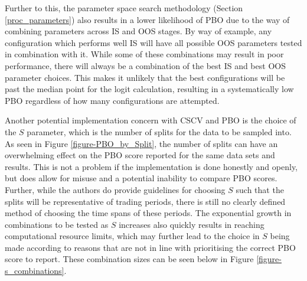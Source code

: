 \documentclass[a4paper,11pt,oneside]{article}
\theoremstyle{plain}
\theoremstyle{definition}
\begin{document}
	Further to this, the parameter space search methodology (Section \ref{proc_parameters}) also results in a lower likelihood of PBO due to the way of combining parameters across IS and OOS stages. By way of example, any configuration which performs well IS will have all possible OOS parameters tested in combination with it. While some of these combinations may result in poor performance, there will always be a combination of the best IS and best OOS parameter choices. This makes it unlikely that the best configurations will be past the median point for the logit calculation, resulting in a systematically low PBO regardless of how many configurations are attempted.\newline
	
	Another potential implementation concern with CSCV and PBO is the choice of the $S$ parameter, which is the number of splits for the data to be sampled into. As seen in Figure \ref{figure-PBO_by_Split}, the number of splits can have an overwhelming effect on the PBO score reported for the same data sets and results. This is not a problem if the implementation is done honestly and openly, but does allow for misuse and a potential inability to compare PBO scores. Further, while the authors do provide guidelines for choosing $S$ such that the splits will be representative of trading periods, there is still no clearly defined method of choosing the time spans of these periods. The exponential growth in combinations to be tested as $S$ increases also quickly results in reaching computational resource limits, which may further lead to the choice in $S$ being made according to reasons that are not in line with prioritising the correct PBO score to report. These combination sizes can be seen below in Figure \ref{figure-s_combinations}.
	
\end{document}
